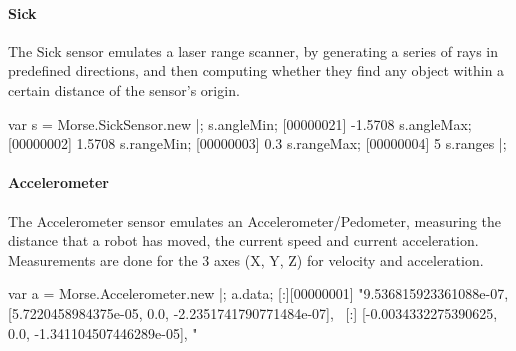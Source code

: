 \paragraph{Sick}

The Sick sensor emulates a laser range scanner, by generating a series of
rays in predefined directions, and then computing whether they find any
object within a certain distance of the sensor’s origin.

\begin{urbiunchecked}
var s = Morse.SickSensor.new |;
s.angleMin;
[00000021] -1.5708
s.angleMax;
[00000002] 1.5708
s.rangeMin;
[00000003] 0.3
s.rangeMax;
[00000004] 5
s.ranges |;
\end{urbiunchecked}

\paragraph{Accelerometer}

The Accelerometer sensor emulates an Accelerometer/Pedometer, measuring the
distance that a robot has moved, the current speed and current
acceleration. Measurements are done for the 3 axes (X, Y, Z) for velocity
and acceleration.

\begin{urbiunchecked}
var a = Morse.Accelerometer.new |;
a.data;
[:][00000001] "9.536815923361088e-07, [5.7220458984375e-05, 0.0, -2.2351741790771484e-07], \
[:]                                   [-0.0034332275390625, 0.0, -1.341104507446289e-05], "
\end{urbiunchecked}

